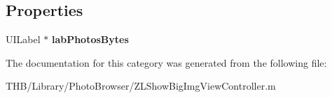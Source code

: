 \subsection*{Properties}
\begin{DoxyCompactItemize}
\item 
\mbox{\label{category_z_l_show_big_img_view_controller_07_08_a474153bc36167d8a75fa58fafa2d1d4f}} 
U\+I\+Label $\ast$ {\bfseries lab\+Photos\+Bytes}
\end{DoxyCompactItemize}


The documentation for this category was generated from the following file\+:\begin{DoxyCompactItemize}
\item 
T\+H\+B/\+Library/\+Photo\+Browser/Z\+L\+Show\+Big\+Img\+View\+Controller.\+m\end{DoxyCompactItemize}

